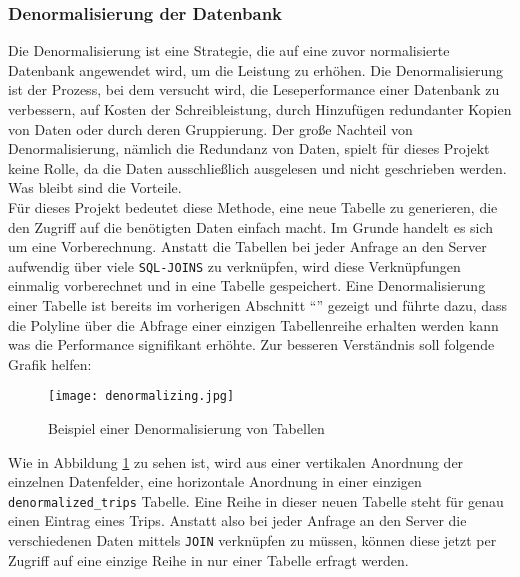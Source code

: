 \subsubsection{Denormalisierung der Datenbank}
\label{ssub:denormalisierung_der_datenbank}
  Die Denormalisierung ist eine Strategie, die auf eine zuvor normalisierte Datenbank angewendet wird, um die Leistung zu erhöhen. Die Denormalisierung ist der Prozess, bei dem versucht wird, die Leseperformance einer Datenbank zu verbessern, auf Kosten der Schreibleistung, durch Hinzufügen redundanter Kopien von Daten oder durch deren Gruppierung.\parencite{sanders}
  Der große Nachteil von Denormalisierung, nämlich die Redundanz von Daten, spielt für dieses Projekt keine Rolle, da die Daten ausschließlich ausgelesen und nicht geschrieben werden. Was bleibt sind die Vorteile.\\

  Für dieses Projekt bedeutet diese Methode, eine neue Tabelle zu generieren, die den Zugriff auf die benötigten Daten einfach macht. Im Grunde handelt es sich um eine Vorberechnung. Anstatt die Tabellen bei jeder Anfrage an den Server aufwendig über viele \texttt{SQL-JOINS} zu verknüpfen, wird diese Verknüpfungen einmalig vorberechnet und in eine Tabelle gespeichert. Eine Denormalisierung  einer Tabelle ist bereits im vorherigen Abschnitt "`"' gezeigt und führte dazu, dass die Polyline über die Abfrage einer einzigen Tabellenreihe erhalten werden kann was die Performance signifikant erhöhte. Zur besseren Verständnis soll folgende Grafik helfen:

  \begin{figure}[htbp]
    \begin{center}
      \texttt{[image: denormalizing.jpg]}
      \caption{Beispiel einer Denormalisierung von Tabellen}
      \label{fig:denormalizing}
    \end{center}
  \end{figure}

  Wie in Abbildung \ref{fig:denormalizing} zu sehen ist, wird aus einer vertikalen Anordnung der einzelnen Datenfelder, eine horizontale Anordnung in einer einzigen \texttt{denormalized\_trips} Tabelle. Eine Reihe in dieser neuen Tabelle steht für genau einen Eintrag eines Trips. Anstatt also bei jeder Anfrage an den Server die verschiedenen Daten mittels \texttt{JOIN} verknüpfen zu müssen, können diese jetzt per Zugriff auf eine einzige Reihe in nur einer Tabelle erfragt werden.\\

